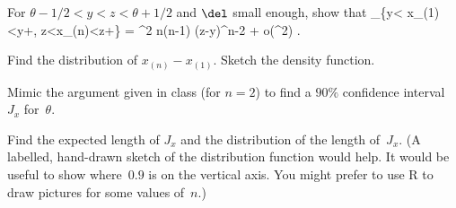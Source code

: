 \documentclass[11pt,letterpaper,leqno,oneside,fleqn]{book}
\begin{document}
\ppart
For $\theta-1/2 <y < z<\theta+1/2$ and $\del$ small enough,
show that
\beqN
\PP_\theta\{y< x_{(1)}<y+\del, z<x_{(n)}<z+\del\} =
\del^2 n(n-1) (z-y)^{n-2} + o(\del^2)
.
\eeqN

\ppart
Find the distribution of $x_{(n)}-x_{(1)}$.  Sketch the density function.

\ppart
Mimic the argument given in class (for $n=2$) to find a $90\%$ confidence interval~$J_x$ for~$\theta$.

\ppart
Find the expected length of $J_x$ and the distribution of the length 
of~$J_x$. (A labelled, hand-drawn sketch of the distribution function would help.
It would be useful to show where~$0.9$ is on the vertical axis.
You might prefer to use R to draw pictures for some values of~$n$.)
\end{document}
